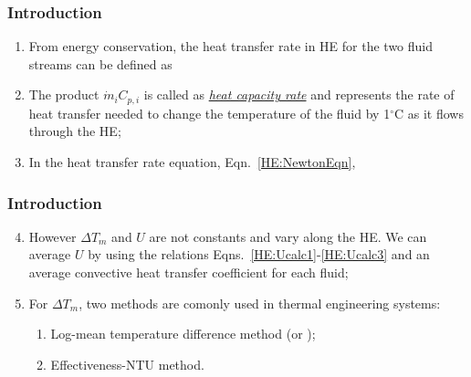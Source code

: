 \documentclass[10pt,compress,unknownkeysallowed]{beamer}
\begin{document}
\begin{frame}
  \frametitle{Introduction}
     \begin{enumerate}%
          \item<1-> From energy conservation, the heat transfer rate in HE for the two fluid streams can be defined as
          \item<2-> The product $\dot{m}_{i}C_{p,i}$ is called as \underline{\it heat capacity rate} and represents the rate of heat transfer needed to change the temperature of the fluid by 1$^{\circ}$C as it flows through the HE;
          \item<2-> In the heat transfer rate equation, Eqn.~\ref{HE:NewtonEqn},
     \end{enumerate}

\end{frame}

\begin{frame}
  \frametitle{Introduction}
     \begin{enumerate}\setcounter{enumi}{3}
          \item<1-> However $\Delta T_{m}$ and $U$ are not constants and vary along the HE. We can average $U$ by using the relations Eqns.~\ref{HE:Ucalc1}-\ref{HE:Ucalc3} and an average convective heat transfer coefficient for each fluid;
          \item<2-> For $\Delta T_{m}$, two methods are comonly used in thermal engineering systems:
             \begin{enumerate}
                \item<2-> Log-mean temperature difference method (or );
                \item<2-> Effectiveness-NTU method.
             \end{enumerate}
     \end{enumerate}

\end{frame}
\end{document}
